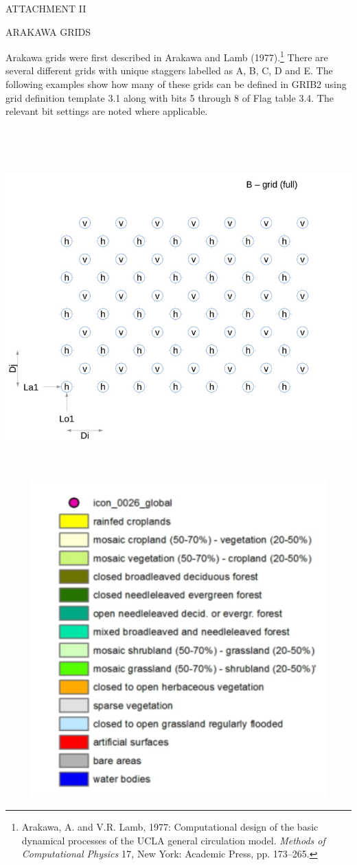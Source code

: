 ATTACHMENT II

ARAKAWA GRIDS

Arakawa grids were first described in Arakawa and Lamb (1977).\footnote{Arakawa, A. and V.R. Lamb, 1977: Computational design of the basic dynamical processes of the UCLA general circulation model. \emph{Methods of Computational Physics} 17\emph{,} New York: Academic Press, pp. 173--265.} There are several different grids with unique staggers labelled as A, B, C, D and E. The following examples show how many of these grids can be defined in GRIB2 using grid definition template 3.1 along with bits 5 through 8 of Flag table 3.4. The relevant bit settings are noted where applicable.

\textbf{\\
}\includegraphics[width=6.49931in,height=5.07361in]{../tex/extracted-media/media/image1.png}\includegraphics[width=6.49931in,height=4.81528in]{../tex/extracted-media/media/image2.png}\textbf{\\
}
